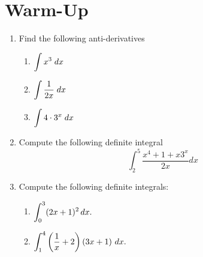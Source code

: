 \documentclass[10pt]{article}
\begin{document}
\pagestyle{otherpages}
\thispagestyle{firstpage}



\section{Warm-Up}
\begin{enumerate}
    \item Find the following anti-derivatives 
    \begin{enumerate}
        \item $\displaystyle \int x^3 \;dx$
        \item $\displaystyle \int \frac{1}{2x} \;dx$
        \item $\displaystyle  \int 4\cdot3^x\;dx$
    \end{enumerate}
    \item Compute the following definite integral
    \[\int_2^5 \frac{x^4+1 + x3^x}{2x}dx\]
    \item Compute the following definite integrals:
    \begin{enumerate}
        \item $\displaystyle \int_0^3 (2x+1)^2\,dx.$
         \item $\displaystyle \int_1^4 \left(\frac 1x + 2\right)\left(3x + 1\right)\,dx.$
    \end{enumerate}    

\end{enumerate}

\newpage
\end{document}
